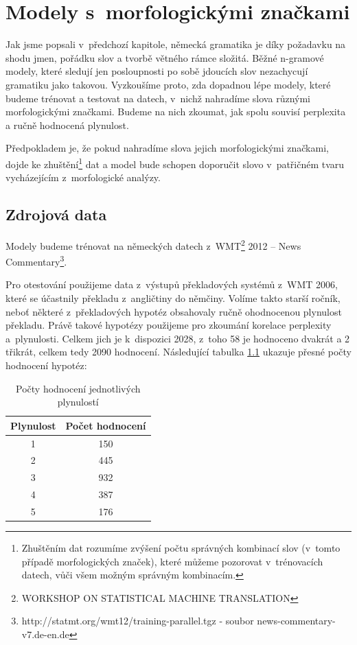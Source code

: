 \documentclass[12pt,a4paper]{report}
\begin{document}
\chapter{Modely s~morfologickými značkami}
Jak jsme popsali v~předchozí kapitole, německá gramatika je díky požadavku na shodu jmen, pořádku slov a tvorbě větného rámce složitá. Běžné n-gramové modely, které sledují jen posloupnosti po sobě jdoucích slov nezachycují gramatiku jako takovou. Vyzkoušíme proto, zda dopadnou lépe modely, které budeme trénovat a testovat na datech, v~nichž nahradíme slova různými morfologickými značkami. Budeme na nich zkoumat, jak spolu souvisí perplexita a ručně hodnocená plynulost.

Předpokladem je, že pokud nahradíme slova jejich morfologickými značkami, dojde ke zhuštění\footnote{Zhuštěním dat rozumíme zvýšení počtu správných kombinací slov (v~tomto případě morfologických značek), které můžeme pozorovat v~trénovacích datech, vůči všem možným správným kombinacím.} dat a model bude schopen doporučit slovo v~patřičném tvaru vycházejícím z~morfologické analýzy.

\section{Zdrojová data}
Modely budeme trénovat na německých datech z~WMT\footnote{WORKSHOP ON STATISTICAL MACHINE TRANSLATION} 2012 -- News Commentary\footnote{http://statmt.org/wmt12/training-parallel.tgz - soubor news-commentary-v7.de-en.de}.

Pro otestování použijeme data z~výstupů překladových systémů z~WMT 2006, které se účastnily překladu z~angličtiny do němčiny. Volíme takto starší ročník, neboť některé z~překladových hypotéz obsahovaly ručně ohodnocenou plynulost překladu. Právě takové hypotézy použijeme pro zkoumání korelace perplexity a~plynulosti. Celkem jich je k~dispozici 2028, z~toho 58 je hodnoceno dvakrát a 2 třikrát, celkem tedy 2090 hodnocení. Následující tabulka \ref{tb:poctyfluency} ukazuje přesné počty hodnocení hypotéz:

\begin{table}[!htbp]
\begin{center}\begin{tabular}{|c|c|}
	\hline
	\textbf{Plynulost} & \textbf{Počet hodnocení}\\
	\hline
	1 & 150\\
	\hline
	2 & 445\\
	\hline
	3 & 932\\
	\hline
	4 & 387\\
	\hline
	5 & 176\\
	\hline
\end{tabular}
\caption{Počty hodnocení jednotlivých plynulostí}\label{tb:poctyfluency}
\end{center}
\end{table}
\end{document}
